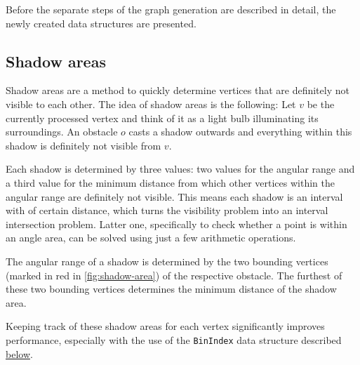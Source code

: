 	Before the separate steps of the graph generation are described in detail, the newly created data structures are presented.
		
	\subsection{Shadow areas}
		
		Shadow areas are a method to quickly determine vertices that are definitely not visible to each other.
		The idea of shadow areas is the following:
		Let $v$ be the currently processed vertex and think of it as a light bulb illuminating its surroundings.
		An obstacle $o$ casts a shadow outwards and everything within this shadow is definitely not visible from $v$.
		
		Each shadow is determined by three values: two values for the angular range and a third value for the minimum distance from which other vertices within the angular range are definitely not visible.
		This means each shadow is an interval with of certain distance, which turns the visibility problem into an interval intersection problem.
		Latter one, specifically to check whether a point is within an angle area, can be solved using just a few arithmetic operations.
		
		The angular range of a shadow is determined by the two bounding vertices (marked in red in \cref{fig:shadow-area}) of the respective obstacle.
		The furthest of these two bounding vertices determines the minimum distance of the shadow area.
		
		Keeping track of these shadow areas for each vertex significantly improves performance, especially with the use of the \texttt{BinIndex} data structure described \hyperref[subsec:binindex]{below}.
		
		
